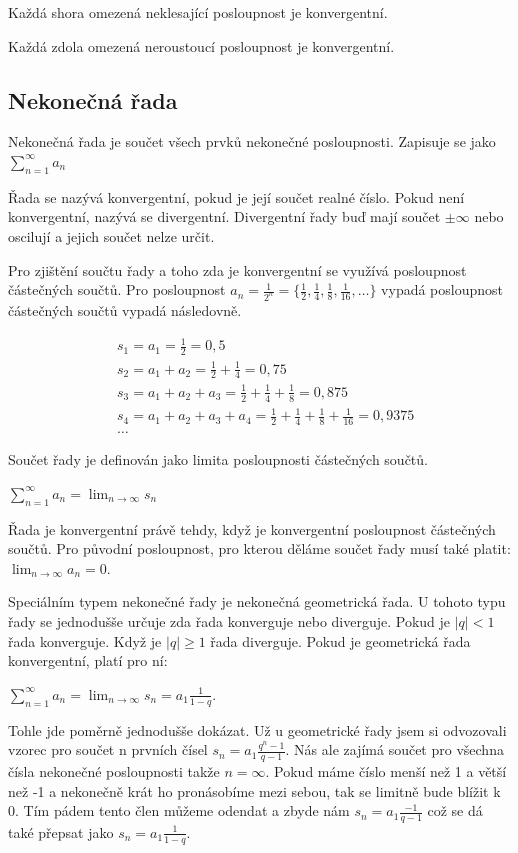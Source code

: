 \documentclass[12pt]{article}
\begin{document}
Každá shora omezená neklesající posloupnost je konvergentní.

Každá zdola omezená neroustoucí posloupnost je konvergentní.
\subsection*{Nekonečná řada}
Nekonečná řada je součet všech prvků nekonečné posloupnosti. Zapisuje se jako
$\sum_{n=1}^{\infty} a_n$

Řada se nazývá konvergentní, pokud je její součet realné číslo. Pokud není konvergentní, nazývá se
divergentní. Divergentní řady buď mají součet $\pm \infty$ nebo oscilují a jejich součet nelze určit.

Pro zjištění součtu řady a toho zda je konvergentní se využívá posloupnost částečných součtů.
Pro posloupnost $a_n = \frac{1}{2^n} = \{\frac{1}{2}, \frac{1}{4}, \frac{1}{8}, \frac{1}{16},
\dots\}$ vypadá posloupnost částečných součtů vypadá následovně.

\[
\begin{align*}
&s_1 = a_1 = \frac{1}{2} = 0,5 \\
&s_2 = a_1 + a_2 = \frac{1}{2} + \frac{1}{4} = 0,75 \\
&s_3 = a_1 + a_2 + a_3 = \frac{1}{2} + \frac{1}{4} + \frac{1}{8} = 0,875 \\
&s_4 = a_1 + a_2 + a_3 + a_4 = \frac{1}{2} + \frac{1}{4} + \frac{1}{8} + \frac{1}{16} = 0,9375 \\
&\dots
\end{align*}
\]

Součet řady je definován jako limita posloupnosti částečných součtů.

$\sum_{n=1}^{\infty} a_n = \lim_{n \to \infty} s_n$

Řada je konvergentní právě tehdy, když je konvergentní posloupnost částečných součtů. Pro původní
posloupnost, pro kterou děláme součet řady musí také platit: $\lim_{n \to \infty} a_n = 0$.

Speciálním typem nekonečné řady je nekonečná geometrická řada. U tohoto typu řady se jednodušše určuje
zda řada konverguje nebo diverguje. Pokud je $|q| < 1$ řada konverguje. Když je $|q| \ge 1$ řada
diverguje. Pokud je geometrická řada konvergentní, platí pro ní:

$\sum_{n=1}^\infty a_n = \lim_{n \to \infty} s_n = a_1 \frac{1}{1-q}.$

Tohle jde poměrně jednodušše dokázat. Už u geometrické řady jsem si odvozovali vzorec pro součet
n prvních čísel $s_n = a_1\frac{q^n -1}{q-1}$. Nás ale zajímá součet pro všechna čísla nekonečné
posloupnosti takže $n = \infty$. Pokud máme číslo menší než 1 a větší než -1 a nekonečně krát ho
pronásobíme mezi sebou, tak se limitně bude blížit k 0. Tím pádem tento člen můžeme odendat a zbyde
nám $s_n = a_1 \frac{-1}{q - 1}$ což se dá také přepsat jako $s_n = a_1 \frac{1}{1 - q}$.
\end{document}
